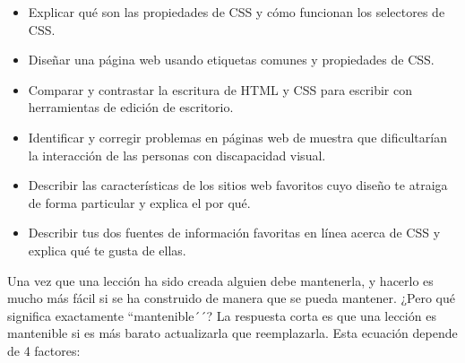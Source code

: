 \begin{itemize}
 
\item
  Explicar qué son las propiedades de CSS y cómo funcionan los selectores de CSS.
 
\item
  Diseñar una página web usando etiquetas comunes y propiedades de CSS.
 
\item
 Comparar y contrastar la escritura de HTML y CSS
para escribir con herramientas de edición de escritorio.
 
\item
  Identificar y corregir problemas en páginas web de muestra
  que dificultarían la interacción de las personas con discapacidad visual.
 
\item
Describir las características de los sitios web favoritos
cuyo diseño te atraiga de forma particular
y explica el por qué.
 
\item
  Describir tus dos fuentes de información favoritas en línea acerca
de CSS y explica qué te gusta de ellas.
 
\end{itemize}
 
 
Una vez que una lección ha sido creada alguien debe mantenerla,
y hacerlo es mucho más fácil si se ha construido de manera que se pueda mantener.
¿Pero qué significa exactamente ``mantenible´´? 
La respuesta corta es que una lección es mantenible
si es más barato actualizarla que reemplazarla.
Esta ecuación depende de 4 factores:
 
